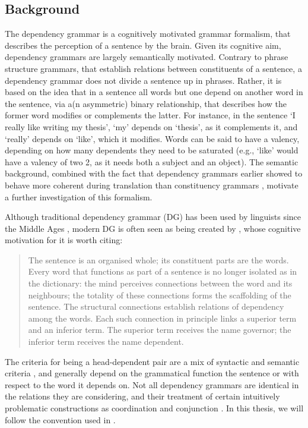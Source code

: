 \documentclass{report}
\begin{document}
\subsection{Background}

The dependency grammar is a cognitively motivated grammar formalism, that describes the perception of a sentence by the brain. Given its cognitive aim, dependency grammars are largely semantically motivated. Contrary to phrase structure grammars, that establish relations between constituents of a sentence, a dependency grammar does not divide a sentence up in phrases. Rather, it is based on the idea that in a sentence all words but one depend on another word in the sentence, via a(n asymmetric) binary relationship, that describes how the former word modifies or complements the latter. For instance, in the sentence `I really like writing my thesis', `my' depends on `thesis', as it complements it, and `really' depends on `like', which it modifies. Words can be said to have a valency, depending on how many dependents they need to be saturated (e.g., `like' would have a valency of two 2, as it needs both a subject and an object). The semantic background, combined with the fact that dependency grammars earlier showed to behave more coherent during translation than constituency grammars \citep{fox2002phrasal}, motivate a further investigation of this formalism. 

Although traditional dependency grammar (DG) has been used by linguists since the Middle Ages \citep{covington1990dependency}, modern DG is often seen as being created by \cite{tesniere1959elements}, whose cognitive motivation for it is worth citing:

\begin{quote}
The sentence is an organised whole; its constituent parts are the words. Every word that functions as part of a sentence is no longer isolated as in the dictionary: the mind perceives connections between the word and its neighbours; the totality of these connections forms the scaffolding of the sentence. The structural connections establish relations of dependency among the words. Each such connection in principle links a superior term and an inferior term. The superior term receives the name governor; the inferior term receives the name dependent. \citep[Translation:][]{ryan2013}
\end{quote}

The criteria for being a head-dependent pair are a mix of syntactic and semantic criteria \citep{nivre2005dependency}, and generally depend on the grammatical function the sentence or with respect to the word it depends on. Not all dependency grammars are identical in the relations they are considering, and their treatment of certain intuitively problematic constructions as coordination and conjunction \citep{nivre2005dependency}. In this thesis, we will follow the convention used in \cite{de2006generating}.
\end{document}
